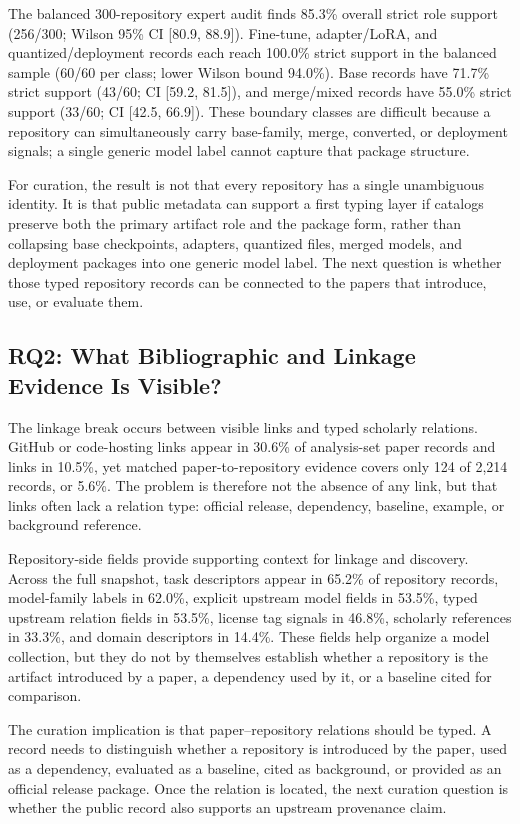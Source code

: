 The balanced 300-repository expert audit finds 85.3\% overall strict role support (256/300; Wilson 95\% CI [80.9, 88.9]). Fine-tune, adapter/LoRA, and quantized/deployment records each reach 100.0\% strict support in the balanced sample (60/60 per class; lower Wilson bound 94.0\%). Base records have 71.7\% strict support (43/60; CI [59.2, 81.5]), and merge/mixed records have 55.0\% strict support (33/60; CI [42.5, 66.9]). These boundary classes are difficult because a repository can simultaneously carry base-family, merge, converted, or deployment signals; a single generic model label cannot capture that package structure.

For curation, the result is not that every repository has a single unambiguous identity. It is that public metadata can support a first typing layer if catalogs preserve both the primary artifact role and the package form, rather than collapsing base checkpoints, adapters, quantized files, merged models, and deployment packages into one generic model label. The next question is whether those typed repository records can be connected to the papers that introduce, use, or evaluate them.

\subsection{RQ2: What Bibliographic and Linkage Evidence Is Visible?}

The linkage break occurs between visible links and typed scholarly relations. GitHub or code-hosting links appear in 30.6\% of analysis-set paper records and \hf links in 10.5\%, yet matched paper-to-\hf repository evidence covers only 124 of 2,214 records, or 5.6\%. The problem is therefore not the absence of any link, but that links often lack a relation type: official release, dependency, baseline, example, or background reference.

Repository-side fields provide supporting context for linkage and discovery. Across the full snapshot, task descriptors appear in 65.2\% of repository records, model-family labels in 62.0\%, explicit upstream model fields in 53.5\%, typed upstream relation fields in 53.5\%, license tag signals in 46.8\%, scholarly references in 33.3\%, and domain descriptors in 14.4\%. These fields help organize a model collection, but they do not by themselves establish whether a repository is the artifact introduced by a paper, a dependency used by it, or a baseline cited for comparison.

The curation implication is that paper--repository relations should be typed. A record needs to distinguish whether a repository is introduced by the paper, used as a dependency, evaluated as a baseline, cited as background, or provided as an official release package. Once the relation is located, the next curation question is whether the public record also supports an upstream provenance claim.

